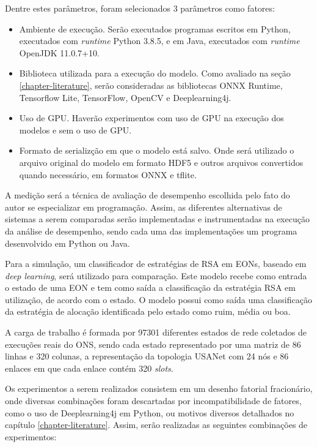 Dentre estes parâmetros, foram selecionados 3 parâmetros como fatores:

\begin{itemize}
  \item Ambiente de execução. Serão executados programas escritos em Python, executados com \textit{runtime} Python 3.8.5, e em Java, executados com \textit{runtime} OpenJDK 11.0.7+10.
  \item Biblioteca utilizada para a execução do modelo. Como avaliado na seção \ref{chapter-literature}, serão consideradas as bibliotecas ONNX Runtime, Tensorflow Lite, TensorFlow, OpenCV e Deeplearning4j.
  \item Uso de GPU. Haverão experimentos com uso de GPU na execução dos modelos e sem o uso de GPU.
  \item Formato de serializção em que o modelo está salvo. Onde será utilizado o arquivo original do modelo em formato HDF5 e outros arquivos convertidos quando necessário, em formatos ONNX e tflite.
\end{itemize}

A medição será a técnica de avaliação de desempenho escolhida pelo fato do autor se especializar em programação. Assim, as diferentes alternativas de sistemas a serem comparadas serão implementadas e instrumentadas na execução da análise de desempenho, sendo cada uma das implementações um programa desenvolvido em Python ou Java.

Para a simulação, um classificador de estratégias de RSA em EONs, baseado em \textit{deep learning}, será utilizado para comparação. Este modelo recebe como entrada o estado de uma EON e tem como saída a classificação da estratégia RSA em utilização, de acordo com o estado. O modelo possui como saída uma classificação da estratégia de alocação identificada pelo estado como ruim, média ou boa.

A carga de trabalho é formada por 97301 diferentes estados de rede coletados de execuções reais do ONS, sendo cada estado representado por uma matriz de 86 linhas e 320 colunas, a representação da topologia USANet com 24 nós e 86 enlaces em que cada enlace contém 320 \textit{slots}.

Os experimentos a serem realizados consistem em um desenho fatorial fracionário, onde diversas combinações foram descartadas por incompatibilidade de fatores, como o uso de Deeplearning4j em Python, ou motivos diversos detalhados no capítulo \ref{chapter-literature}. Assim, serão realizadas as seguintes combinações de experimentos:

